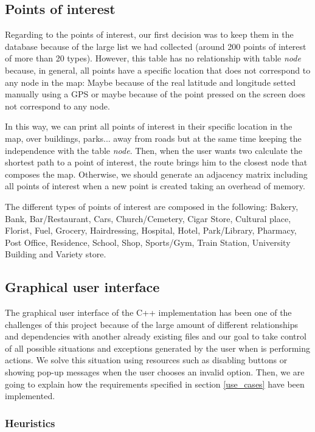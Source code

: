 \documentclass{article}
\begin{document}
\subsection{Points of interest}
Regarding to the points of interest, our first decision was to keep them in the database because of the large list we had collected (around 200 points of interest of more than 20 types). However, this table has no relationship with table \textit{node} because, in general, all points have a specific location that does not correspond to any node in the map: Maybe because of the real latitude and longitude setted manually using a GPS or maybe because of the point pressed on the screen does not correspond to any node.

In this way, we can print all points of interest in their specific location in the map, over buildings, parks... away from roads but at the same time keeping the independence with the table \textit{node}. Then, when the user wants two calculate the shortest path to a point of interest, the route brings him to the closest node that composes the map. Otherwise, we should generate an adjacency matrix including all points of interest when a new point is created taking an overhead of memory.

The different types of points of interest are composed in the following: Bakery, Bank, Bar/Restaurant, Cars, Church/Cemetery, Cigar Store, Cultural place, Florist, Fuel, Grocery, Hairdressing, Hospital, Hotel, Park/Library, Pharmacy, Post Office, Residence, School, Shop, Sports/Gym, Train Station, University Building and Variety store.

\subsection{Graphical user interface}
The graphical user interface of the C++ implementation has been one of the challenges of this project because of the large amount of different relationships and dependencies with another already existing files and our goal to take control of all possible situations and exceptions generated by the user when is performing actions. We solve this situation using resources such as disabling buttons or showing pop-up messages when the user chooses an invalid option. Then, we are going to explain how the requirements specified in section \ref{use_cases} have been implemented.

\subsubsection{Heuristics}
\end{document}
